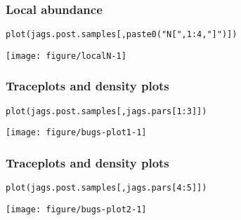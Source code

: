 \documentclass[color=usenames,dvipsnames]{beamer}\usepackage[]{graphicx}\usepackage[]{xcolor}
\makeatletter
\newcommand{\hlnum}[1]{\textcolor[rgb]{0.69,0.494,0}{#1}}%
\newcommand{\hlstr}[1]{\textcolor[rgb]{0.749,0.012,0.012}{#1}}%
\newcommand{\hlopt}[1]{\textcolor[rgb]{0,0,0}{#1}}%
\newcommand{\hlstd}[1]{\textcolor[rgb]{0,0,0}{#1}}%
\newcommand{\hlkwd}[1]{\textcolor[rgb]{0.004,0.004,0.506}{#1}}%
\newenvironment{kframe}{%
 \def\at@end@of@kframe{}%
 \ifinner\ifhmode%
  \def\at@end@of@kframe{\end{minipage}}%
  \begin{minipage}{\columnwidth}%
 \fi\fi%
 \def\FrameCommand##1{\hskip\@totalleftmargin \hskip-\fboxsep
 \colorbox{shadecolor}{##1}\hskip-\fboxsep
     \hskip-\linewidth \hskip-\@totalleftmargin \hskip\columnwidth}%
 \MakeFramed {\advance\hsize-\width
   \@totalleftmargin\z@ \linewidth\hsize
   \@setminipage}}%
 {\par\unskip\endMakeFramed%
 \at@end@of@kframe}
\newenvironment{knitrout}{}{} %
\makeatother
\begin{document}
\begin{frame}[fragile]
  \frametitle{Local abundance}
\begin{knitrout}\scriptsize
{}\color{fgcolor}\begin{kframe}
\begin{alltt}
\hlkwd{plot}\hlstd{(jags.post.samples[,}\hlkwd{paste0}\hlstd{(}\hlstr{"N["}\hlstd{,} \hlnum{1}\hlopt{:}\hlnum{4}\hlstd{,} \hlstr{"]"}\hlstd{)])}
\end{alltt}
\end{kframe}

{\centering \texttt{[image: figure/localN-1]} 

}


\end{knitrout}
\end{frame}



\begin{frame}[fragile]
  \frametitle{Traceplots and density plots}
\begin{knitrout}\footnotesize
{}\color{fgcolor}\begin{kframe}
\begin{alltt}
\hlkwd{plot}\hlstd{(jags.post.samples[,jags.pars[}\hlnum{1}\hlopt{:}\hlnum{3}\hlstd{]])}
\end{alltt}
\end{kframe}

{\centering \texttt{[image: figure/bugs-plot1-1]} 

}


\end{knitrout}
\end{frame}



\begin{frame}[fragile]
  \frametitle{Traceplots and density plots}
\begin{knitrout}\footnotesize
{}\color{fgcolor}\begin{kframe}
\begin{alltt}
\hlkwd{plot}\hlstd{(jags.post.samples[,jags.pars[}\hlnum{4}\hlopt{:}\hlnum{5}\hlstd{]])}
\end{alltt}
\end{kframe}

{\centering \texttt{[image: figure/bugs-plot2-1]} 

}


\end{knitrout}
\end{frame}
\end{document}
